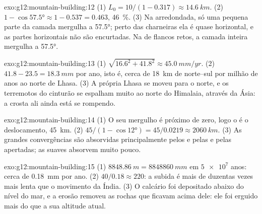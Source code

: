 \begin{solution}{exo:g12:mountain-building:12}
(1) $L_0 = 10/(1 - 0.317) \approx \qty{14.6}{km}$. (2) $1 - \cos\ang{57.5}
\approx 1 - 0.537 = 0.463$, \qty{46}{\percent}. (3) Na  arredondada,
só uma pequena parte da camada mergulha a \ang{57.5}; perto das charneiras
ela é quase horizontal, e as partes horizontais não são encurtadas. Na 
de flancos retos, a camada inteira mergulha a \ang{57.5}.
\end{solution}

\begin{solution}{exo:g12:mountain-building:13}
(1) $\sqrt{16.6^2 + 41.8^2} \approx \qty{45.0}{mm/yr}$. (2) $41.8 - 23.5 =
\qty{18.3}{mm}$ por ano, isto é, cerca de \qty{18}{km} de 
norte--sul por milhão de anos ao norte de Lhasa. (3) A própria Lhasa se
moveu para o norte, e os terremotos do cinturão se espalham muito ao norte
do Himalaia, através da Ásia: a crosta ali ainda está se rompendo.
\end{solution}

\begin{solution}{exo:g12:mountain-building:14}
(1) O seu mergulho é próximo de zero, logo o  é o deslocamento,
\qty{45}{km}. (2) $45/(1 - \cos\ang{12}) = 45/0.0219 \approx \qty{2060}{km}$.
(3) As grandes convergências são absorvidas principalmente pelos
 e pelas  e pelas  apertadas; as  suaves
absorvem muito pouco.
\end{solution}

\begin{solution}{exo:g12:mountain-building:15}
(1) $\qty{8848.86}{m} = \qty{8848860}{mm}$ em $\num{5e7}$ anos: cerca de
\qty{0.18}{mm} por ano. (2) $40/0.18 \approx 220$: a subida é mais de
duzentas vezes mais lenta que o movimento da Índia. (3) O calcário foi
depositado abaixo do nível do mar, e a erosão removeu as rochas que ficavam
acima dele: ele foi erguido mais do que a sua altitude atual.
\end{solution}

